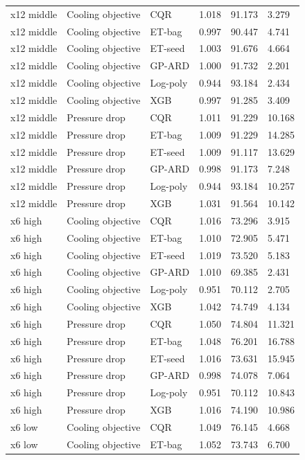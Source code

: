 \begin{longtable}{llllll}
x12 middle & Cooling objective & CQR & 1.018 & 91.173 & 3.279\\
x12 middle & Cooling objective & ET-bag & 0.997 & 90.447 & 4.741\\
x12 middle & Cooling objective & ET-seed & 1.003 & 91.676 & 4.664\\
x12 middle & Cooling objective & GP-ARD & 1.000 & 91.732 & 2.201\\
x12 middle & Cooling objective & Log-poly & 0.944 & 93.184 & 2.434\\
x12 middle & Cooling objective & XGB & 0.997 & 91.285 & 3.409\\
x12 middle & Pressure drop & CQR & 1.011 & 91.229 & 10.168\\
x12 middle & Pressure drop & ET-bag & 1.009 & 91.229 & 14.285\\
x12 middle & Pressure drop & ET-seed & 1.009 & 91.117 & 13.629\\
x12 middle & Pressure drop & GP-ARD & 0.998 & 91.173 & 7.248\\
x12 middle & Pressure drop & Log-poly & 0.944 & 93.184 & 10.257\\
x12 middle & Pressure drop & XGB & 1.031 & 91.564 & 10.142\\
x6 high & Cooling objective & CQR & 1.016 & 73.296 & 3.915\\
x6 high & Cooling objective & ET-bag & 1.010 & 72.905 & 5.471\\
x6 high & Cooling objective & ET-seed & 1.019 & 73.520 & 5.183\\
x6 high & Cooling objective & GP-ARD & 1.010 & 69.385 & 2.431\\
x6 high & Cooling objective & Log-poly & 0.951 & 70.112 & 2.705\\
x6 high & Cooling objective & XGB & 1.042 & 74.749 & 4.134\\
x6 high & Pressure drop & CQR & 1.050 & 74.804 & 11.321\\
x6 high & Pressure drop & ET-bag & 1.048 & 76.201 & 16.788\\
x6 high & Pressure drop & ET-seed & 1.016 & 73.631 & 15.945\\
x6 high & Pressure drop & GP-ARD & 0.998 & 74.078 & 7.064\\
x6 high & Pressure drop & Log-poly & 0.951 & 70.112 & 10.843\\
x6 high & Pressure drop & XGB & 1.016 & 74.190 & 10.986\\
x6 low & Cooling objective & CQR & 1.049 & 76.145 & 4.668\\
x6 low & Cooling objective & ET-bag & 1.052 & 73.743 & 6.700\\

\end{longtable}
